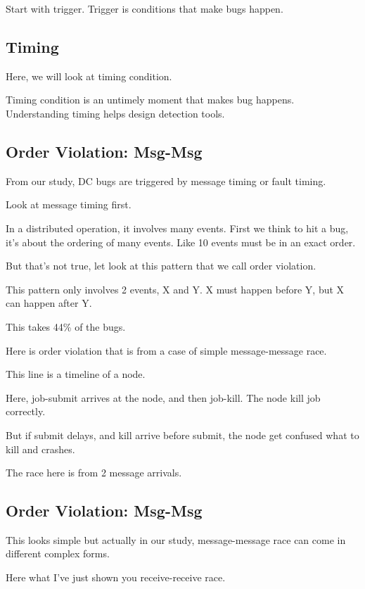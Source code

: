 
Start with trigger. Trigger is conditions that make bugs happen.

\subsection{Timing}

Here, we will look at timing condition.

Timing condition is an untimely moment that makes bug happens. Understanding
timing helps design detection tools.

\subsection{Order Violation: Msg-Msg}

From our study, DC bugs are triggered by message timing or fault timing.

Look at message timing first. 

In a distributed operation, it involves many events. First we think to hit a
bug, it's about the ordering of many events. Like 10 events must be in an exact
order.

But that's not true, let look at this pattern that we call order violation. 

This pattern only involves 2 events, X and Y. X must happen before Y, but X can
happen after Y.

This takes 44\% of the bugs.

Here is order violation that is from a case of simple message-message race.

This line is a timeline of a node.

Here, job-submit arrives at the node, and then job-kill. The node kill job
correctly.

But if submit delays, and kill arrive before submit, the node get confused what
to kill and crashes.

The race here is from 2 message arrivals.

\subsection{Order Violation: Msg-Msg}

This looks simple but actually in our study, message-message race can come in
different complex forms. 

Here what I've just shown you receive-receive race. 


